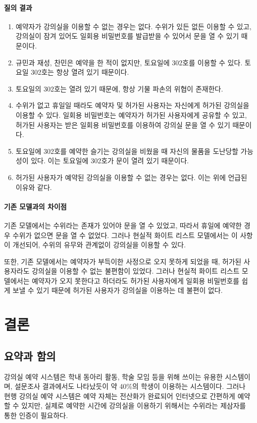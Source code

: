 \documentclass[11pt,a4paper]{article}
\begin{document}
\paragraph{질의 결과}
\begin{enumerate}
\item 예약자가 강의실을 이용할 수 없는 경우는 없다. 수위가 있든 없든 이용할 수
있고, 강의실이 잠겨 있어도 일회용 비밀번호를 발급받을 수 있어서 문을 열 수 있기
때문이다.
\item 규민과 재성, 찬민은 예약을 한 적이 없지만, 토요일에 302호를 이용할 수
있다. 토요일 302호는 항상 열려 있기 때문이다.
\item 토요일의 302호는 열려 있기 때문에, 항상 기물 파손의 위협이 존재한다.
\item 수위가 없고 휴일일 때라도 예약자 및 허가된 사용자는 자신에게 허가된
강의실을 이용할 수 있다. 일회용 비밀번호는 예약자가 허가된 사용자에게 공유할 수
있고, 허가된 사용자는 받은 일회용 비밀번호를 이용하여 강의실 문을 열 수 있기
때문이다.
\item 토요일에 302호를 예약한 슬기는 강의실을 비웠을 때 자신의 물품을 도난당할
가능성이 있다. 이는 토요일에 302호가 문이 열려 있기 때문이다.
\item 허가된 사용자가 예약된 강의실을 이용할 수 없는 경우는 없다. 이는 위에
언급된 이유와 같다.
\end{enumerate}

\paragraph{기존 모델과의 차이점}
\hfill\break
\indent
기존 모델에서는 수위라는 존재가 있어야 문을 열 수 있었고, 따라서 휴일에 예약한
경우 수위가 없으면 문을 열 수 없었다. 그러나 현실적 화이트 리스트 모델에서는 이
사항이 개선되어, 수위의 유무와 관계없이 강의실을 이용할 수 있다.

또한, 기존 모델에서는 예약자가 부득이한 사정으로 오지 못하게 되었을 때, 허가된
사용자라도 강의실을 이용할 수 없는 불편함이 있었다. 그러나 현실적 화이트 리스트
모델에서는 예약자가 오지 못한다고 하더라도 허가된 사용자에게 일회용 비밀번호를
쉽게 보낼 수 있기 때문에 허가된 사용자가 강의실을 이용하는 데 불편이 없다.

\section{결론}

\subsection{요약과 함의}
강의실 예약 시스템은 학내 동아리 활동, 학술 모임 등을 위해 쓰이는 유용한
시스템이며, 설문조사 결과에서도 나타났듯이 약 40\%의 학생이 이용하는
시스템이다. 그러나 현행 강의실 예약 시스템은 예약 자체는 전산화가 완료되어
인터넷으로 간편하게 예약할 수 있지만, 실제로 예약한 시간에 강의실을 이용하기
위해서는 수위라는 제삼자를 통한 인증이 필요하다.
\end{document}
